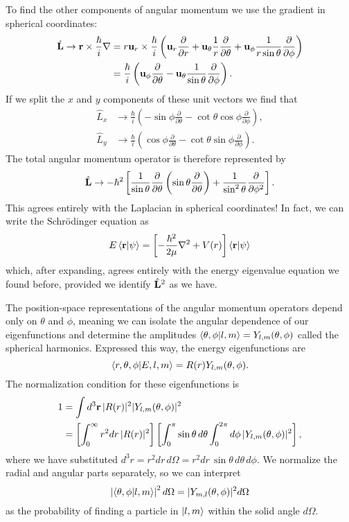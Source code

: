 \documentclass[../p116main.tex]{subfiles}
\begin{document}
To find the other components of angular momentum we use the gradient in spherical coordinates:
\begin{align*}
    \hat{\mathbf{L}} \to \mathbf{r} \times \frac{\hbar}{i} \nabla &= r \mathbf{u}_r \times \frac{\hbar}{i} \left( \mathbf{u}_r \frac{\partial}{\partial r} + \mathbf{u}_\theta \frac{1}{r} \frac{\partial}{\partial \theta} + \mathbf{u}_\phi \frac{1}{r \sin \theta} \frac{\partial}{\partial \phi} \right) \\
    &= \frac{\hbar}{i} \left( \mathbf{u}_\phi \frac{\partial}{\partial \theta} - \mathbf{u}_\theta \frac{1}{\sin \theta} \frac{\partial}{\partial \phi} \right).
\end{align*}
If we split the $x$ and $y$ components of these unit vectors we find that
\begin{align*}
    \hat L_x &\to \frac{\hbar}{i} \left( -\sin \phi \frac{\partial}{\partial \theta} - \cot \theta \cos \phi \frac{\partial}{\partial \phi} \right), \\
    \hat L_y &\to \frac{\hbar}{i} \left( \cos \phi \frac{\partial}{\partial \theta} - \cot \theta \sin \phi \frac{\partial}{\partial \phi} \right).
\end{align*}
The total angular momentum operator is therefore represented by
\[ \hat{\mathbf{L}} \to -\hbar^2 \left[ \frac{1}{\sin \theta} \frac{\partial}{\partial \theta} \left( \sin \theta \frac{\partial}{\partial \theta} \right) + \frac{1}{\sin^2 \theta} \frac{\partial}{\partial \phi^2} \right]. \]
This agrees entirely with the Laplacian in spherical coordinates!
In fact, we can write the Schrödinger equation as
\[ E \left< \mathbf{r} \middle| \psi \right> = \left[ -\frac{\hbar^2}{2\mu} \nabla^2 + V(r) \right] \left< \mathbf{r} \middle| \psi \right> \]
which, after expanding, agrees entirely with the energy eigenvalue equation we found before, provided we identify $\hat{\mathbf{L}}^2$ as we have.

The position-space representations of the angular momentum operators depend only on $\theta$ and $\phi$, meaning we can isolate the angular dependence of our eigenfunctions and determine the amplitudes $\left< \theta,\phi \middle| l,m \right> = Y_{l,m}(\theta,\phi)$ called the spherical harmonics.
Expressed this way, the energy eigenfunctions are
\[ \left< r, \theta, \phi \middle| E, l, m \right> = R(r) Y_{l,m}(\theta, \phi). \]
The normalization condition for these eigenfunctions is
\begin{align*}
    1 &= \int d^3 \mathbf{r} \, |R(r)|^2 |Y_{l,m}(\theta, \phi)|^2 \\
    &= \left[ \int_0^\infty r^2 dr \, |R(r)|^2 \right] \left[ \int_0^\pi \sin \theta \,d\theta \int_0^{2\pi} d\phi \, |Y_{l,m}(\theta, \phi)|^2 \right],
\end{align*}
where we have substituted $d^3 r = r^2 dr \,d\Omega = r^2 dr \, \sin \theta \, d\theta \, d\phi$.
We normalize the radial and angular parts separately, so we can interpret
\[ \left| \left< \theta, \phi \middle| l,m \right> \right|^2 d\Omega = |Y_{m,l}(\theta, \phi)|^2 d\Omega \]
as the probability of finding a particle in $\left| l,m \right>$ within the solid angle $d\Omega$.
\end{document}
